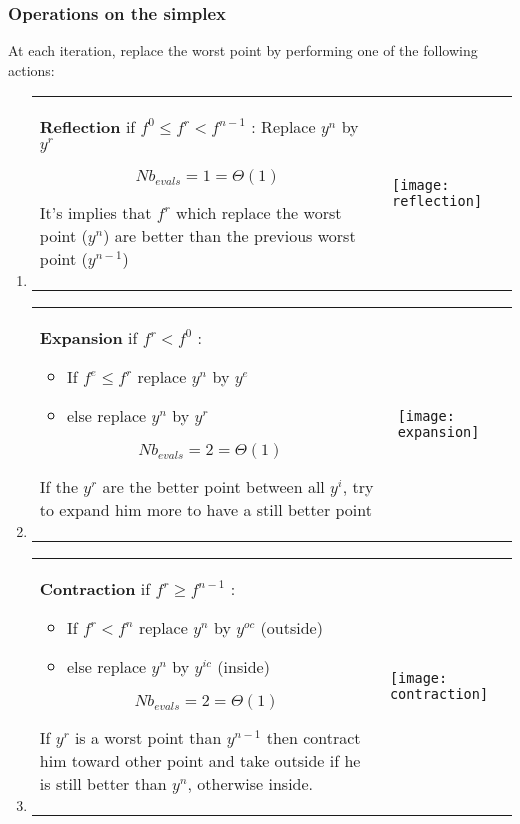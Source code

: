 \subsubsection{Operations on the simplex}
At each iteration, replace the worst point by performing one of the
following actions:
\begin{enumerate}
    \item \begin{tabular}{m{11cm}m{3cm}}
            \textbf{Reflection} if $f^0 \leq f^r < f^{n-1}$ : Replace $y^n$ by $y^r$

            $$Nb_{evals} = 1 = \Theta(1)$$

            It's implies that $f^r$ which replace the worst point ($y^n$) are better than
            the previous worst point ($y^{n-1}$)
            & 
            \texttt{[image: reflection]}
        \end{tabular}

    \item \begin{tabular}{m{11cm}m{3cm}}
            \textbf{Expansion} if $f^r < f^0$ : 
            \begin{itemize}
                \item If $f^e \leq f^r$ replace $y^n$ by $y^e$
                \item else replace $y^n$ by $y^r$
            \end{itemize}

            $$Nb_{evals} = 2 = \Theta(1)$$

            If the $y^r$ are the better point between all $y^i$, try to
            expand him more to have a still better point
            & 
            \texttt{[image: expansion]}
        \end{tabular}

    \item \begin{tabular}{m{11cm}m{3cm}}
            \textbf{Contraction} if $f^r \geq f^{n-1}$ : 
            \begin{itemize}
                \item If $f^r < f^n$ replace $y^n$ by $y^{oc}$ (outside)
                \item else replace $y^n$ by $y^{ic}$ (inside)
            \end{itemize}

            $$Nb_{evals} = 2 = \Theta(1)$$

            If $y^r$ is a worst point than $y^{n-1}$ then contract him 
            toward other point and take outside if he is still better
            than $y^n$, otherwise inside.
            & 
            \texttt{[image: contraction]}
        \end{tabular}


\end{enumerate}
